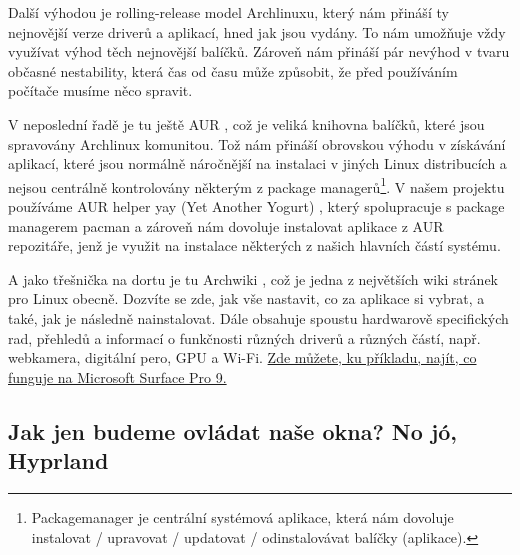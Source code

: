 \documentclass[12pt,a4paper]{article}
\begin{document}
Další výhodou je rolling-release model Archlinuxu, který nám přináší ty nejnovější verze driverů a aplikací,
hned jak jsou vydány.
To nám umožňuje vždy využívat výhod těch nejnovější balíčků. Zároveň nám přináší pár nevýhod v tvaru
občasné nestability, která čas od času může způsobit, že před používáním počítače musíme něco spravit.

V neposlední řadě je tu ještě AUR \autocite{AURHome}, což je veliká knihovna balíčků, které jsou spravovány Archlinux
komunitou. Tož nám přináší obrovskou výhodu v získávání aplikací, které jsou normálně náročnější na instalaci
v jiných Linux distribucích a nejsou centrálně kontrolovány některým z package managerů\footnote{Packagemanager je centrální systémová
aplikace, která nám dovoluje instalovat / upravovat / updatovat / odinstalovávat balíčky (aplikace).}.
V našem projektu používáme AUR helper yay (Yet Another Yogurt) \autocite{joJguerYay2026}, který spolupracuje s
package managerem pacman a zároveň nám dovoluje instalovat aplikace z AUR repozitáře, jenž je využit na instalace
některých z našich hlavních částí systému.

A jako třešnička na dortu je tu Archwiki \autocite{ArchWiki}, což je jedna z největších wiki stránek pro Linux obecně.
Dozvíte se zde, jak vše nastavit, co za aplikace si vybrat, a také, jak je následně nainstalovat. Dále
obsahuje spoustu hardwarově specifických rad, přehledů a informací o funkčnosti různých driverů a různých částí,
např. webkamera, digitální pero, GPU a Wi-Fi. \href{https://wiki.archlinux.org/title/Microsoft_Surface_Pro_9}{Zde můžete,
ku příkladu, najít, co funguje na Microsoft Surface Pro 9.}


\subsection{Jak jen budeme ovládat naše okna? No jó, Hyprland}

\end{document}
